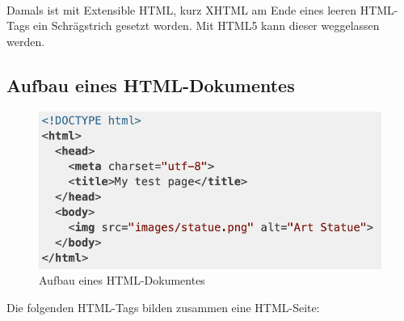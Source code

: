 \mbox{}\\
Damals ist mit Extensible HTML, kurz XHTML am Ende eines leeren HTML-Tags ein Schrägstrich gesetzt worden. Mit HTML5 kann dieser weggelassen werden. 

\subsection{Aufbau eines HTML-Dokumentes}

\begin{figure}[H]
	\begin{center}
		\includegraphics[scale=.7]{images/html-document-structure.png}
	\end{center}
		\caption{Aufbau eines HTML-Dokumentes}
\end{figure}

Die folgenden HTML-Tags bilden zusammen eine HTML-Seite:

